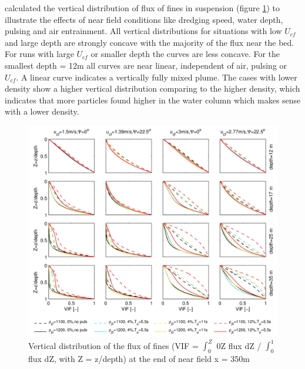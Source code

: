 \newpage
\noindent \cite{Dewit} calculated the vertical distribution of flux of fines in suspension (figure \ref{fig:depth_dewit}) to illustrate the effects of near field conditions like dredging speed, water depth, pulsing and air entrainment. All vertical distributions for situations with low $U_{cf}$ and large depth are strongly concave with the majority of the flux near the bed. For runs with large $U_{cf}$ or smaller depth the curves are less concave. For the smallest depth = 12m all curves are near linear, independent of air, pulsing or $U_{cf}$. A linear curve indicates a vertically fully mixed plume. The cases with lower density show a higher vertical distribution comparing to the higher density, which indicates that more particles found higher in the water column which makes sense with a lower density. \newline \noindent 

\begin{figure}[ht!]
    \centering
    \includegraphics[width = 1\textwidth]{Images/Dredging_depth.png}
    \caption{Vertical distribution of the flux of fines (VIF =  $\int_{0}^{Z}$ 0Z flux dZ / $\int_{0}^{1}$ flux dZ, with Z =  z/depth) at the end of near field x =  350m}
    \label{fig:depth_dewit}
\end{figure}










\newpage
